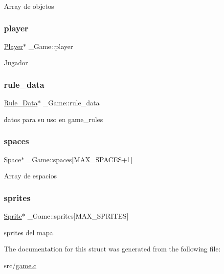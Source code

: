 Array de objetos \mbox{\label{struct__Game_a31406605782d71ec00c4bf258ea76267}} 
\subsubsection{\texorpdfstring{player}{player}}
{\footnotesize\ttfamily \hyperlink{struct__Player}{Player}$\ast$ \+\_\+\+Game\+::player}

Jugador \mbox{\label{struct__Game_a2e88124c71d697f962654f2518a62109}} 
\subsubsection{\texorpdfstring{rule\+\_\+data}{rule\_data}}
{\footnotesize\ttfamily \hyperlink{struct__Rule__Data}{Rule\+\_\+\+Data}$\ast$ \+\_\+\+Game\+::rule\+\_\+data}

datos para su uso en game\+\_\+rules \mbox{\label{struct__Game_ab4180417d9148f8abb2233ca6c4ecfe5}} 
\subsubsection{\texorpdfstring{spaces}{spaces}}
{\footnotesize\ttfamily \hyperlink{struct__Space}{Space}$\ast$ \+\_\+\+Game\+::spaces\mbox{[}M\+A\+X\+\_\+\+S\+P\+A\+C\+ES+1\mbox{]}}

Array de espacios \mbox{\label{struct__Game_a457e4328c3dfd137ba4407ad8e041cf2}} 
\subsubsection{\texorpdfstring{sprites}{sprites}}
{\footnotesize\ttfamily \hyperlink{struct__Sprite}{Sprite}$\ast$ \+\_\+\+Game\+::sprites\mbox{[}M\+A\+X\+\_\+\+S\+P\+R\+I\+T\+ES\mbox{]}}

sprites del mapa 

The documentation for this struct was generated from the following file\+:\begin{DoxyCompactItemize}
\item 
src/\hyperlink{game_8c}{game.\+c}\end{DoxyCompactItemize}
